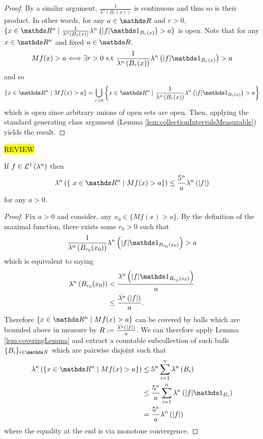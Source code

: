 \begin{proof}
    By a similar argument, $\frac{1}{\lambda^n \left(B_r(x)\right)}$ is continuous and thus so is their product. In other words, for any $a \in \R$ and $r>0$, $\{ x \in \R^n \mid \frac{1}{\lambda^n \left(B_r(x)\right) } \lambda^n \left( \lvert f \rvert \indicate_{B_r(x)} \right)  > a\}$ is open. Note that for any $x \in \R^n$ and fixed $ a \in \R$.
    \[
    	Mf(x) > a \Longleftrightarrow \exists r > 0 \text{ s.t } \frac{1}{\lambda^n \left(B_r(x)\right) } \lambda^n \left( \lvert f \rvert \indicate_{B_r(x)} \right)  > a
    \] and so 
    \[
    	\{ x \in \R^n \mid Mf(x) > a\} = \bigcup_{r > 0}  \left\{x \in \R^n \mid \frac{1}{\lambda^n \left(B_r(x)\right) } \lambda^n \left( \lvert f \rvert \indicate_{B_r(x)} \right)  > a \right\}
    \]
    which is open since arbitrary unions of open sets are open. Then, applying the standard generating class argument (Lemma \ref{lem:collectionIntervalsMeasurable}) yields the result.
\end{proof}


\hl{REVIEW}
\begin{thm}
	\label{thm:hardyLittlewoodWeakInequality} If $f \in \mathcal{L}^{1}\left(\lambda^n\right)$ then 
	\[
		\lambda^n\left( \{\ x \in \R^n \mid Mf(x) > a \}\right) \leq \frac{5^n}{a}\lambda^n\left(\lvert f \rvert\right)
	\]
	for any $a > 0$.
\end{thm}

\begin{proof}
	Fix $a>0$ and consider, any $x_0 \in \{Mf(x) > a\}$. By the definition of the maximal function, there exists some $r_0>0$ such that
	\[
		\frac{1}{\lambda^n\left(B_{r_0}(x_0)\right)}\lambda^n\left(\lvert f \rvert \indicate_{B_{r_0}(x_0)}\right) > a
	\] 
	which is equivalent to saying
	\begin{align*}
		\lambda^n\left( B_{r_0}(x_0)\right) &< \frac{\lambda^n\left( \lvert f\rvert \indicate_{B_{r_0}(x_0)} \right)}{a} \\
		&\leq \frac{\lebInt{\lambda^n}{\lvert f \rvert }}{a}.
	\end{align*}
	Therefore $\{ x \in \R^n \mid Mf(x) > a\}$ can be covered by balls which are bounded above in measure by $R:=\frac{\bar{\lambda^n}\left(\lvert f \rvert \right)}{a}$. We can therefore apply Lemma \ref{lem:coveringLemma} and extract a countable subcollection of such balls $\{B_i\}_{i\in\N}$ which are pairwise disjoint such that
	\begin{align*}
		\lambda^n \left( \{ x \in \R^n \mid Mf(x) > a\} \right) &\leq  5^n \sum_{i=1}^n \lambda^n\left( B_i\right) \\
		&\leq \frac{5^n}{a} \sum_{i=1}^n \lambda^n\left(\lvert f \rvert \indicate_{B_i}\right) \\
		&= \frac{5^n}{a}\lambda^n\left( \lvert f \rvert \right)
	\end{align*}
where the equality at the end is via monotone convergence.
\end{proof}




